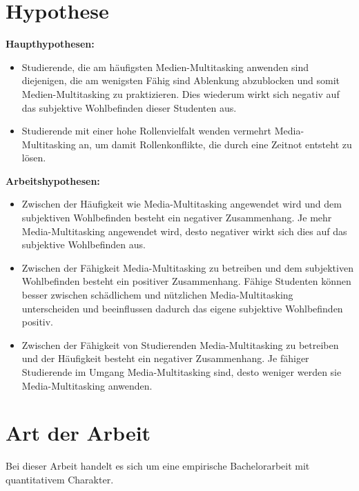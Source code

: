 \section*{Hypothese}\label{section.hypothesen}
\textbf{Haupthypothesen:}
\begin{itemize}
    \item Studierende, die am häufigsten Medien-Multitasking anwenden sind diejenigen, die am wenigsten Fähig sind Ablenkung abzublocken und somit Medien-Multitasking zu praktizieren. Dies wiederum wirkt sich negativ auf das subjektive Wohlbefinden dieser Studenten aus. 
     \item Studierende mit einer hohe Rollenvielfalt wenden vermehrt Media-Multitasking an, um damit Rollenkonflikte, die durch eine Zeitnot entsteht zu lösen.
\end{itemize}
\textbf{Arbeitshypothesen:}
\begin{itemize}
    \item Zwischen der Häufigkeit wie Media-Multitasking angewendet wird und dem subjektiven Wohlbefinden besteht ein negativer Zusammenhang. Je mehr Media-Multitasking angewendet wird, desto negativer wirkt sich dies auf das subjektive Wohlbefinden aus.
    \item Zwischen der Fähigkeit Media-Multitasking zu betreiben und dem subjektiven Wohlbefinden besteht ein positiver Zusammenhang. Fähige Studenten können besser zwischen schädlichem und nützlichen Media-Multitasking unterscheiden und beeinflussen dadurch das eigene subjektive Wohlbefinden positiv.
    \item Zwischen der Fähigkeit von Studierenden Media-Multitasking zu betreiben und der Häufigkeit besteht ein negativer Zusammenhang. Je fähiger Studierende im Umgang Media-Multitasking sind, desto weniger werden sie Media-Multitasking anwenden.
\end{itemize}
\section*{Art der Arbeit}\label{section.artArbeit}
Bei dieser Arbeit handelt es sich um eine empirische Bachelorarbeit mit quantitativem Charakter. 
